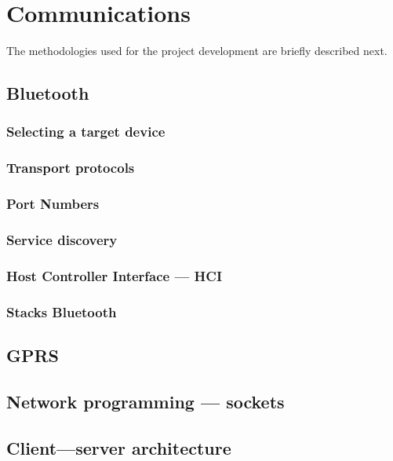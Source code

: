 \section{Communications}
The methodologies used for the project development are briefly described next.
% 
%
\subsection{Bluetooth}%
\label{sec:bluetooth}
%
\subsubsection{Selecting a target device}%
\label{sec:bt-target-device}
%
\subsubsection{Transport protocols}%
\label{sec:bt-transport-protocols}
%
\subsubsection{Port Numbers}%
\label{sec:bt-port-nrs}
%
\subsubsection{Service discovery}%
\label{sec:bt-service-discovery}
%
\subsubsection{Host Controller Interface --- HCI}%
\label{sec:bt-hci}
%
\subsubsection{Stacks Bluetooth}%
\label{sec:bt-hci}
%
\subsection{GPRS}%
\label{sec:gprs}
%
\subsection{Network programming --- sockets}%
\label{sec:netw-progr-sock}
%
\subsection{Client---server architecture}%
\label{sec:client-serv-arch}
